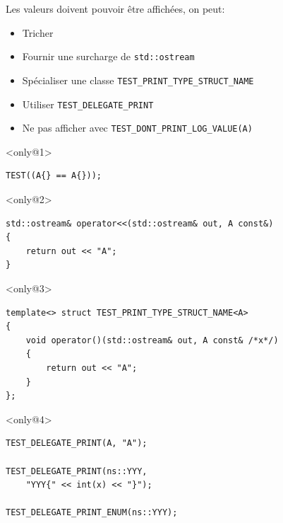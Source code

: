 \documentclass{beamer}
\begin{document}
\begin{frame}[fragile]
Les valeurs doivent pouvoir être affichées, on peut:

\begin{itemize}[<+->]
 \item Tricher
 \item Fournir une surcharge de \lstinline{std::ostream}
 \item Spécialiser une classe \lstinline{TEST_PRINT_TYPE_STRUCT_NAME}
 \item Utiliser \lstinline{TEST_DELEGATE_PRINT}
 \item Ne pas afficher avec \lstinline{TEST_DONT_PRINT_LOG_VALUE(A)}
\end{itemize}

\begin{exampleblock}{}<only@1>
\begin{lstlisting}
TEST((A{} == A{}));
\end{lstlisting}
\end{exampleblock}

\begin{exampleblock}{}<only@2>
\begin{lstlisting}
std::ostream& operator<<(std::ostream& out, A const&)
{
    return out << "A";
}
\end{lstlisting}
\end{exampleblock}

\begin{exampleblock}{}<only@3>
\begin{lstlisting}
template<> struct TEST_PRINT_TYPE_STRUCT_NAME<A>
{
    void operator()(std::ostream& out, A const& /*x*/)
    {
        return out << "A";
    }
};
\end{lstlisting}
\end{exampleblock}

\begin{exampleblock}{}<only@4>
\begin{lstlisting}
TEST_DELEGATE_PRINT(A, "A");

TEST_DELEGATE_PRINT(ns::YYY,
    "YYY{" << int(x) << "}");

TEST_DELEGATE_PRINT_ENUM(ns::YYY);
\end{lstlisting}
\end{exampleblock}
\end{frame}
\end{document}
